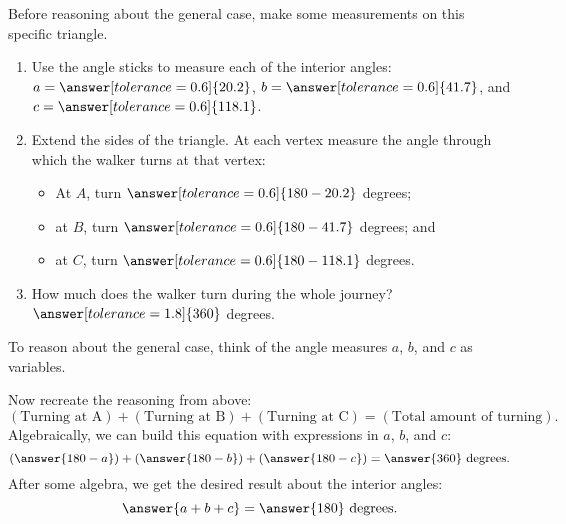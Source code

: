 \documentclass[nooutcomes,noauthor]{ximera}
\begin{document}
\begin{problem}
Before reasoning about the general case, make some measurements on this specific triangle.  
\begin{enumerate}
\item Use the angle sticks to measure each of the interior angles: $a=\answer[tolerance=0.6]{20.2}$, $b=\answer[tolerance=0.6]{41.7}$, and $c=\answer[tolerance=0.6]{118.1}$.
\item Extend the sides of the triangle.  At each vertex measure the angle through which the walker turns at that vertex:  
\begin{itemize}
\item At $A$, turn $\answer[tolerance=0.6]{180-20.2}$ degrees;  
\item at $B$, turn $\answer[tolerance=0.6]{180-41.7}$ degrees; and 
\item at $C$, turn $\answer[tolerance=0.6]{180-118.1}$ degrees.
\end{itemize}
\item How much does the walker turn during the whole journey?  $\answer[tolerance=1.8]{360}$ degrees.
\end{enumerate}

\begin{problem}
To reason about the general case, think of the angle measures $a$, $b$, and $c$ as variables.  


Now recreate the reasoning from above:  
\[
\left(\text{Turning at A}\right) + \left(\text{Turning at B}\right) + \left(\text{Turning at C}\right) = \left(\text{Total amount of turning}\right).
\]
Algebraically, we can build this equation with expressions in $a$, $b$, and $c$:  
\[
\left(\answer{180-a}\right) + \left(\answer{180-b}\right) + \left(\answer{180-c}\right)  = \answer{360} \text{ degrees.}
\]
After some algebra, we get the desired result about the interior angles:  
\[
\answer{a+b+c}=\answer{180} \text{ degrees}. 
\]

\end{problem}
\end{problem}
\end{document}
